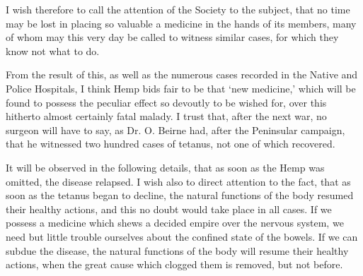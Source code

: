 \documentclass[a4paper, 11pt, oneside, polutonikogreek, english]{article}
\begin{document}
I wish therefore to call the attention of the Society to the subject, that no time may be lost in placing so valuable a medicine in the hands of its members, many of whom may this very day be called to witness similar cases, for which they know not what to do.

From the result of this, as well as the numerous cases recorded in the Native and Police Hospitals, I think Hemp bids fair to be that `new medicine,' which will be found to possess the peculiar effect so devoutly to be wished for, over this hitherto almost certainly fatal malady. I trust that, after the next war, no surgeon will have to say, as Dr. O. Beirne had, after the Peninsular campaign, that he witnessed two hundred cases of tetanus, not one of which recovered.

It will be observed in the following details, that as soon as the Hemp was omitted, the disease relapsed. I wish also to direct attention to the fact, that as soon as the tetanus began to decline, the natural functions of the body resumed their healthy actions, and this no doubt would take place in all cases. If we possess a medicine which shews a decided empire over the nervous system, we need but little trouble ourselves about the confined state of the bowels. If we can subdue the disease, the natural functions of the body will resume their healthy actions, when the great cause which clogged them is removed, but not before.
\end{document}

